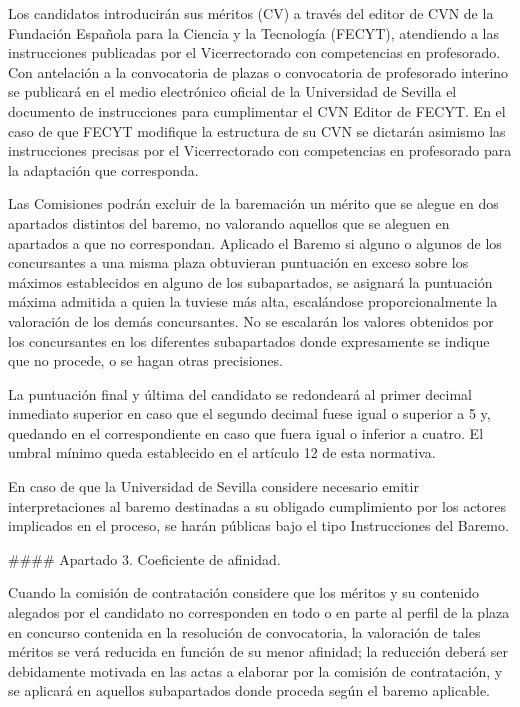 \documentclass{article}
\begin{document}
\begin{itemize}
\begin{itemize}
\begin{scriptsize}
                  Los candidatos introducirán sus méritos (CV) a través del editor de CVN de la Fundación Española para la Ciencia y la Tecnología (FECYT), atendiendo a las instrucciones publicadas por el Vicerrectorado con competencias en profesorado. Con antelación a la convocatoria de plazas o convocatoria de profesorado interino se publicará en el medio electrónico oficial de la Universidad de Sevilla el documento de instrucciones para cumplimentar el CVN Editor de FECYT. En el caso de que FECYT modifique la estructura de su CVN se dictarán asimismo las instrucciones precisas por el Vicerrectorado con competencias en profesorado para la adaptación que corresponda.

                  Las Comisiones podrán excluir de la baremación un mérito que se alegue en dos apartados distintos del baremo, no valorando aquellos que se aleguen en apartados a que no correspondan. Aplicado el Baremo si alguno o algunos de los concursantes a una misma plaza obtuvieran puntuación en exceso sobre los máximos establecidos en alguno de los subapartados, se asignará la puntuación máxima admitida a quien la tuviese más alta, escalándose proporcionalmente la valoración de los demás concursantes. No se escalarán los valores obtenidos por los concursantes en los diferentes subapartados donde expresamente se indique que no procede, o se hagan otras precisiones.

                  La puntuación final y última del candidato se redondeará al primer decimal inmediato superior en caso que el segundo decimal fuese igual o superior a 5 y, quedando en el correspondiente en caso que fuera igual o inferior a cuatro. El umbral mínimo queda establecido en el artículo 12 de esta normativa.

                  En caso de que la Universidad de Sevilla considere necesario emitir interpretaciones al baremo destinadas a su obligado cumplimiento por los actores implicados en el proceso, se harán públicas bajo el tipo Instrucciones del Baremo.

                  \#\#\#\# Apartado 3. Coeficiente de afinidad.

                  Cuando la comisión de contratación considere que los méritos y su contenido alegados por el candidato no corresponden en todo o en parte al perfil de la plaza en concurso contenida en la resolución de convocatoria, la valoración de tales méritos se verá reducida en función de su menor afinidad; la reducción deberá ser debidamente motivada en las actas a elaborar por la comisión de contratación, y se aplicará en aquellos subapartados donde proceda según el baremo aplicable.


\end{scriptsize}
\end{itemize}
\end{itemize}
\end{document}
